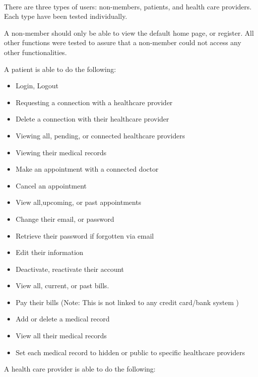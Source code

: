 \documentclass[12pt]{report}
\begin{document}
\paragraph{} 
There are three types of users: non-members, patients, and health care providers. Each type have been tested individually.

A non-member should only be able to view the default home page, or register. All other functions were tested to assure that a non-member could not access any other functionalities. 

A patient is able to do the following:
\begin{itemize}
\item Login, Logout
\item Requesting a connection with a healthcare provider
\item Delete a connection with their healthcare provider
\item Viewing all, pending, or connected healthcare providers
\item Viewing their medical records
\item Make an appointment with a connected doctor
\item Cancel an appointment 
\item View all,upcoming, or past appointments
\item Change their email, or password
\item Retrieve their password if forgotten via email
\item Edit their information
\item Deactivate, reactivate their account
\item View all, current, or past bills.
\item Pay their bills (Note: This is not linked to any credit card/bank system ) 
\item Add or delete a medical record
\item View all their medical records
\item Set each medical record to hidden or public to specific healthcare providers
\end{itemize}
A health care provider is able to do the following:
\end{document}
